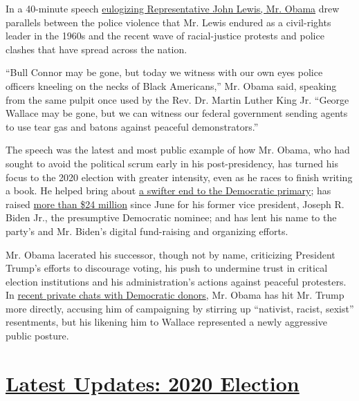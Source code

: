 In a 40-minute speech
\href{https://www.nytimes.com/2020/07/30/us/obama-eulogy-john-lewis-full-transcript.html}{eulogizing
Representative John Lewis, Mr. Obama} drew parallels between the police
violence that Mr. Lewis endured as a civil-rights leader in the 1960s
and the recent wave of racial-justice protests and police clashes that
have spread across the nation.

``Bull Connor may be gone, but today we witness with our own eyes police
officers kneeling on the necks of Black Americans,'' Mr. Obama said,
speaking from the same pulpit once used by the Rev. Dr. Martin Luther
King Jr. ``George Wallace may be gone, but we can witness our federal
government sending agents to use tear gas and batons against peaceful
demonstrators.''

The speech was the latest and most public example of how Mr. Obama, who
had sought to avoid the political scrum early in his post-presidency,
has turned his focus to the 2020 election with greater intensity, even
as he races to finish writing a book. He helped bring about
\href{https://www.nytimes.com/2020/04/14/us/politics/obama-biden-democratic-primary.html}{a
swifter end to the Democratic primary}; has raised
\href{https://www.nytimes.com/2020/07/30/us/politics/obama-trump-biden.html}{more
than \$24 million} since June for his former vice president, Joseph R.
Biden Jr., the presumptive Democratic nominee; and has lent his name to
the party's and Mr. Biden's digital fund-raising and organizing efforts.

Mr. Obama lacerated his successor, though not by name, criticizing
President Trump's efforts to discourage voting, his push to undermine
trust in critical election institutions and his administration's actions
against peaceful protesters. In
\href{https://www.nytimes.com/2020/07/30/us/politics/obama-trump-biden.html}{recent
private chats with Democratic donors}, Mr. Obama has hit Mr. Trump more
directly, accusing him of campaigning by stirring up ``nativist, racist,
sexist'' resentments, but his likening him to Wallace represented a
newly aggressive public posture.

\hypertarget{latest-updates-2020-election}{%
\section{\texorpdfstring{\href{https://www.nytimes.com/2020/07/31/us/elections/biden-vs-trump.html?action=click\&pgtype=Article\&state=default\&region=MAIN_CONTENT_1\&context=storylines_live_updates}{Latest
Updates: 2020
Election}}{Latest Updates: 2020 Election}}\label{latest-updates-2020-election}}

